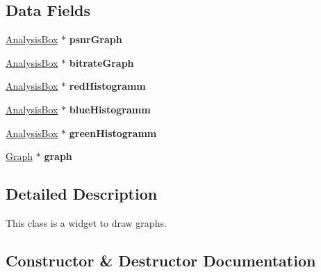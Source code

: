 \subsection*{Data Fields}
\begin{DoxyCompactItemize}
\item 
\hypertarget{classGraphWidget_a92c21bd4b0ab4923c60b274ba8271e2a}{}\hyperlink{classAnalysisBox}{Analysis\+Box} $\ast$ {\bfseries psnr\+Graph}\label{classGraphWidget_a92c21bd4b0ab4923c60b274ba8271e2a}

\item 
\hypertarget{classGraphWidget_a4a7c8cb1da5222de1e2db8a757c07a70}{}\hyperlink{classAnalysisBox}{Analysis\+Box} $\ast$ {\bfseries bitrate\+Graph}\label{classGraphWidget_a4a7c8cb1da5222de1e2db8a757c07a70}

\item 
\hypertarget{classGraphWidget_a6f4193b028b8538bf02229e7647ff276}{}\hyperlink{classAnalysisBox}{Analysis\+Box} $\ast$ {\bfseries red\+Histogramm}\label{classGraphWidget_a6f4193b028b8538bf02229e7647ff276}

\item 
\hypertarget{classGraphWidget_a6a5e98ef390ed3f6c2554770cbc0107e}{}\hyperlink{classAnalysisBox}{Analysis\+Box} $\ast$ {\bfseries blue\+Histogramm}\label{classGraphWidget_a6a5e98ef390ed3f6c2554770cbc0107e}

\item 
\hypertarget{classGraphWidget_a74fd2d42a7f22db494b63b0389d2798a}{}\hyperlink{classAnalysisBox}{Analysis\+Box} $\ast$ {\bfseries green\+Histogramm}\label{classGraphWidget_a74fd2d42a7f22db494b63b0389d2798a}

\item 
\hypertarget{classGraphWidget_a2360aba01fa93c8493ba96683c4fb89c}{}\hyperlink{classGraph}{Graph} $\ast$ {\bfseries graph}\label{classGraphWidget_a2360aba01fa93c8493ba96683c4fb89c}

\end{DoxyCompactItemize}


\subsection{Detailed Description}
This class is a widget to draw graphs. 

\subsection{Constructor \& Destructor Documentation}
\hypertarget{classGraphWidget_a6d80d51caf0aee4c148baee49978f8c3}{}
